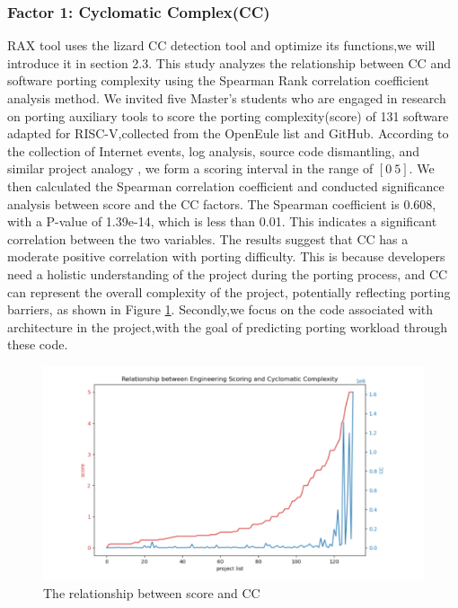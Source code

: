 \documentclass[sigconf,screen,review]{acmart}
\begin{document}
\subsubsection{Factor 1: Cyclomatic Complex(CC)}
RAX tool uses the lizard CC detection tool and optimize its functions,we will introduce it in section 2.3.
This study analyzes the relationship between CC and software porting complexity using the Spearman Rank correlation coefficient analysis method.
We invited five Master's students who are engaged in research on porting auxiliary tools to score the porting complexity(score) of 131 software adapted for RISC-V,collected from the OpenEule list and GitHub.
According to the collection of Internet events, log analysis, source code dismantling, and similar project analogy \cite{liangguanyu2020}, we form a scoring interval in the range of $[0~5]$.
We then calculated the Spearman correlation coefficient and conducted significance analysis between score and the CC factors.
The Spearman coefficient is 0.608, with a P-value of 1.39e-14, which is less than 0.01.
This indicates a significant correlation between the two variables.
The results suggest that CC has a moderate positive correlation with porting difficulty.
This is because developers need a holistic understanding of the project during the porting process, and CC can represent the overall complexity of the project, potentially reflecting porting barriers, as shown in Figure \ref{fig:relationship}.
Secondly,we focus on the code associated with architecture in the project,with the goal of predicting porting workload through these code.

\begin{figure}
  \centering
  \includegraphics[width=\linewidth]{relationship.pdf}
  \caption{The relationship between score and CC}
  \label{fig:relationship}
\end{figure}
\end{document}

